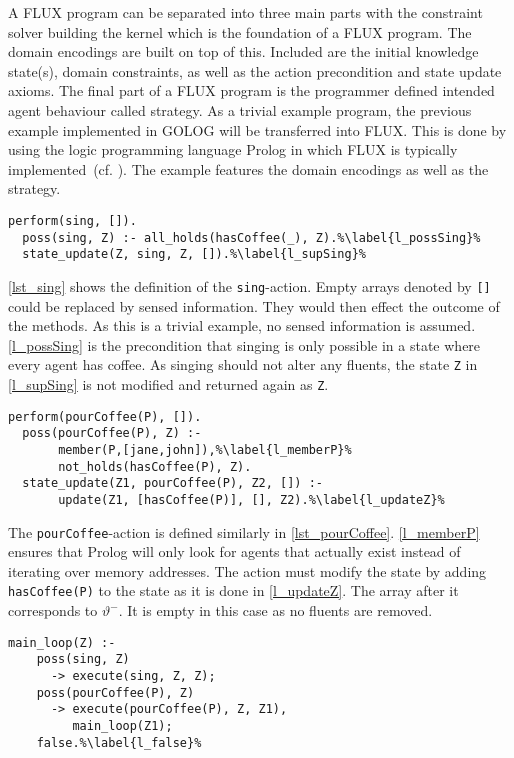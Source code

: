 A FLUX program can be separated into three main parts with the constraint solver building the kernel which is the foundation of a FLUX program.
The domain encodings are built on top of this.
Included are the initial knowledge state(s), domain constraints, as well as the action precondition and state update axioms.
The final part of a FLUX program is the programmer defined intended agent behaviour called strategy.
As a trivial example program, the previous example implemented in GOLOG will be transferred into FLUX.
This is done by using the logic programming language Prolog in which FLUX is typically implemented~(cf. \cite{thielscher_reasoning_2006,martin_addressing_2001}). %
The example features the domain encodings as well as the strategy.
\begin{lstlisting}[caption={Defintion of the \texttt{sing}-action.}, label=lst_sing]
  perform(sing, []).
  poss(sing, Z) :- all_holds(hasCoffee(_), Z).%\label{l_possSing}%
  state_update(Z, sing, Z, []).%\label{l_supSing}%
\end{lstlisting}
\autoref{lst_sing} shows the definition of the \texttt{sing}-action.
Empty arrays denoted by \texttt{[]} could be replaced by sensed information.
They would then effect the outcome of the methods.
As this is a trivial example, no sensed information is assumed.
\autoref{l_possSing} is the precondition that singing is only possible in a state where every agent has coffee.
As singing should not alter any fluents, the state \texttt{Z} in \autoref{l_supSing} is not modified and returned again as \texttt{Z}.
\begin{lstlisting}[firstnumber=4, caption={Definition of the \texttt{pourCoffee}-action}, label=lst_pourCoffee]
  perform(pourCoffee(P), []).
  poss(pourCoffee(P), Z) :-
       member(P,[jane,john]),%\label{l_memberP}%
       not_holds(hasCoffee(P), Z).
  state_update(Z1, pourCoffee(P), Z2, []) :-
       update(Z1, [hasCoffee(P)], [], Z2).%\label{l_updateZ}%
\end{lstlisting}
The \texttt{pourCoffee}-action is defined similarly in \autoref{lst_pourCoffee}.
\autoref{l_memberP} ensures that Prolog will only look for agents that actually exist instead of iterating over memory addresses.
The action must modify the state by adding \texttt{hasCoffee(P)} to the state as it is done in \autoref{l_updateZ}.
The array after it corresponds to $\vartheta^-$.
It is empty in this case as no fluents are removed.
\begin{lstlisting}[firstnumber=10, caption={Main method which either tells the robot to sing or to pour coffee.}, label=lst_main]
  main_loop(Z) :-
    poss(sing, Z)
      -> execute(sing, Z, Z);
    poss(pourCoffee(P), Z)
      -> execute(pourCoffee(P), Z, Z1),
         main_loop(Z1);
    false.%\label{l_false}%
\end{lstlisting}
